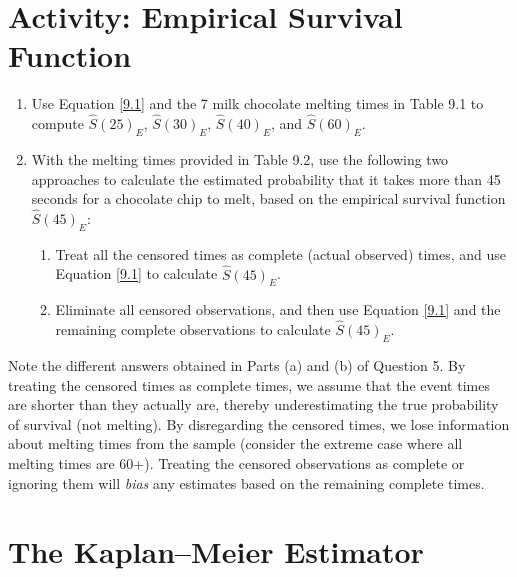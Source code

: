 \documentclass[
]{report}
\providecommand{\tightlist}{%
  \setlength{\itemsep}{0pt}\setlength{\parskip}{0pt}}
\begin{document}
\section*{Activity: Empirical Survival Function}\label{activity-empirical-survival-function}

\begin{enumerate}
\def\labelenumi{\arabic{enumi}.}
\setcounter{enumi}{3}
\tightlist
\item
  Use Equation \ref{9.1} and the 7 milk chocolate melting times in Table 9.1 to compute \(\hat S(25)_{E}\), \(\hat S(30)_{E}\), \(\hat S(40)_{E}\), and \(\hat S(60)_{E}\).\\
\item
  With the melting times provided in Table 9.2, use the following two approaches to calculate the estimated probability that it takes more than 45 seconds for a chocolate chip to melt, based on the empirical survival function \(\hat S(45)_{E}\):

  \begin{enumerate}
  \def\labelenumii{\alph{enumii}.}
  \tightlist
  \item
    Treat all the censored times as complete (actual observed) times, and use Equation \ref{9.1} to calculate \(\hat S(45)_{E}\).\\
  \item
    Eliminate all censored observations, and then use Equation \ref{9.1} and the remaining complete observations to calculate \(\hat S(45)_{E}\).
  \end{enumerate}
\end{enumerate}

Note the different answers obtained in Parts (a) and (b) of Question 5. By treating the censored times as complete times, we assume that the event times are shorter than they actually are, thereby underestimating the true probability of survival (not melting). By disregarding the censored times, we lose information about melting times from the sample (consider the extreme case where all melting times are 60+). Treating the censored observations as complete or ignoring them will \emph{bias} any estimates based on the remaining complete times.

\section*{The Kaplan--Meier Estimator}\label{the-kaplanmeier-estimator}
\end{document}
